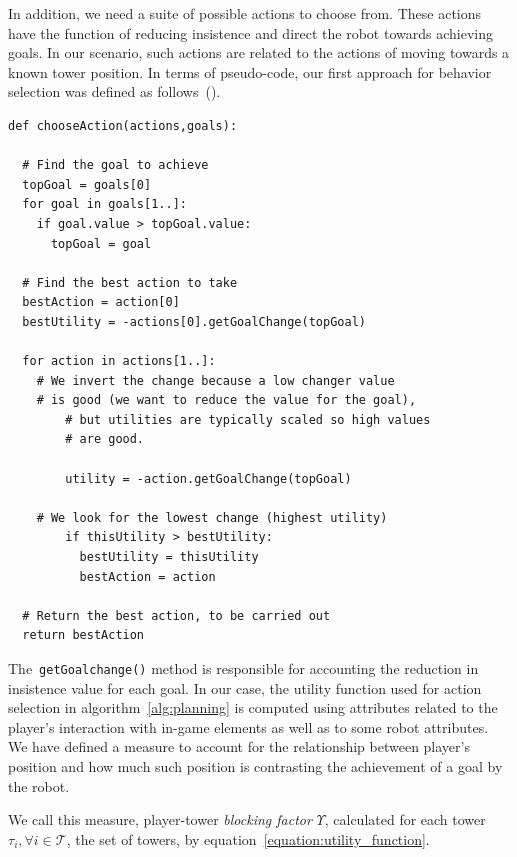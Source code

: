 In addition, we need a suite of possible actions to choose from. These actions have the function of reducing insistence and direct the robot towards achieving goals. In our scenario, such actions are related to the actions of moving towards a known tower position. In terms of pseudo-code, our first approach for behavior selection was defined as follows~(\cite{millington_artificial_2009}).

\begin{lstlisting}[caption=A basic~\gls{gob} algorithm for action selection.]
def chooseAction(actions,goals):

  # Find the goal to achieve    
  topGoal = goals[0]
  for goal in goals[1..]:
    if goal.value > topGoal.value:
      topGoal = goal
    	
  # Find the best action to take
  bestAction = action[0]
  bestUtility = -actions[0].getGoalChange(topGoal)

  for action in actions[1..]:
    # We invert the change because a low changer value 
    # is good (we want to reduce the value for the goal),
    	# but utilities are typically scaled so high values 
    	# are good.
    		
    	utility = -action.getGoalChange(topGoal)
    		
    # We look for the lowest change (highest utility)
    	if thisUtility > bestUtility:
    	  bestUtility = thisUtility 
    	  bestAction = action
    			
  # Return the best action, to be carried out
  return bestAction
\end{lstlisting}\label{alg:planning}

The~\verb|getGoalchange()| method is responsible for accounting the reduction in insistence value for each goal. In our case, the utility function used for action selection in algorithm~\ref{alg:planning} is computed using attributes related to the player's interaction with in-game elements as well as to some robot attributes. We have defined a measure to account for the relationship between player's position and how much such position is contrasting the achievement of a goal by the robot.

We call this measure, player-tower \textit{blocking factor} $\Upsilon$, calculated for each tower  $\tau_{i},\forall i \in \mathcal{T}$, the set of towers, by equation~\ref{equation:utility_function}. 

